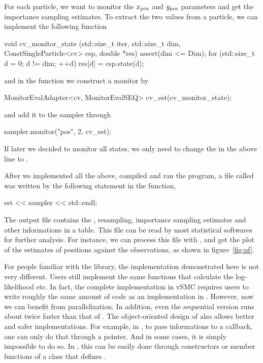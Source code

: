 \documentclass[11pt, bib, hyper, mint, minted=cache]{marticle}
\begin{document}
For each particle, we want to monitor the $x_{\mathrm{pos}}$ and $y_{\mathrm{pos}}$ parameters and
get the importance sampling estimates. To extract the two values from a
particle, we can implement the following function
\begin{cppcode}
void cv_monitor_state (std::size_t iter, std::size_t dim,
    ConstSingleParticle<cv> csp, double *res)
{
    assert(dim <= Dim);
    for (std::size_t d = 0; d != dim; ++d)
        res[d] = csp.state(d);
}
\end{cppcode}
and in the  function we construct a monitor by
\begin{cppcode}
MonitorEvalAdapter<cv, MonitorEvalSEQ> cv_est(cv_monitor_state);
\end{cppcode}
and add it to the sampler through
\begin{cppcode}
sampler.monitor("pos", 2, cv_est);
\end{cppcode}
If later we decided to monitor all states, we only need to change the
 in the above line to .

After we implemented all the above, compiled and ran the program, a file
called  was written by the following statement in the
 function,
\begin{cppcode}
est << sampler << std::endl;
\end{cppcode}
The output file contains the \ess, resampling, importance sampling estimates
and other informations in a table. This file can be read by most statistical
softwares for further analysis. For instance, we can process this file with
\lrlang, and get the plot of the estimates of positions against the
observations, as shown in figure~\ref{fig:pf}.

For people familiar with the \lsmctc library, the implementation demonstrated
here is not very different. Users still implement the same functions that
calculate the log-likelihood etc. In fact, the complete implementation in vSMC
requires users to write roughly the same amount of code as an implementation
in \lsmctc. However, now we can benefit from parallelization. In addition,
even the sequential version runs about twice faster than that of \lsmctc. The
object-oriented design of \vsmc also allows better and safer implementations.
For example, in \lsmctc, to pass informations to a callback, one can only do
that through a  pointer. And in some cases, it is simply
impossible to do so. In \vsmc, this can be easily done through constructors or
member functions of a class that defines .
\end{document}
